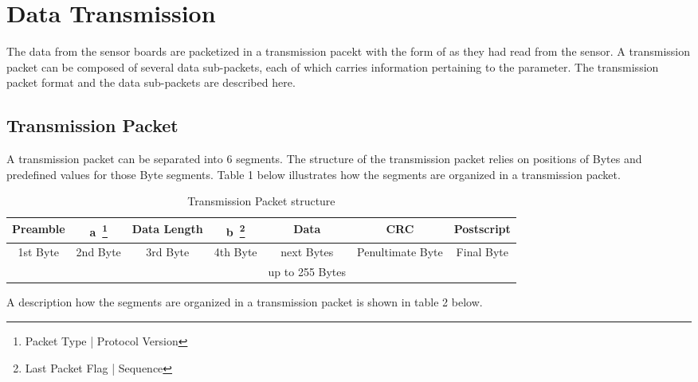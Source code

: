 \newpage
\section{Data Transmission} \label{section:overall}

The data from the sensor boards are packetized in a transmission pacekt with the form of as they had read from the sensor. A transmission packet can be composed of several data sub-packets, each of which carries information pertaining to the parameter.
The transmission packet format and the data sub-packets are described here.

\subsection{Transmission Packet}
A transmission packet can be separated into 6 segments.
The structure of the transmission packet relies on positions of Bytes and predefined values for those Byte segments. 
Table 1 below illustrates how the segments are organized in a transmission packet.
\\

\begin{table}[h!]
\begin{minipage}{\textwidth}
    \centering
    \caption{Transmission Packet structure}
    \label{table:tran}
    \begin{tabular}{|c|c|c|c|c|c|c|}
        \hline
        \rowcolor{black!8}
        \textbf{Preamble} & \textbf{a~\footnote{Packet Type | Protocol Version}} & \textbf{Data Length} & \textbf{b~\footnote{Last Packet Flag | Sequence}} & \textbf{Data} & \textbf{CRC} & \textbf{Postscript}\\
        \hline
        \multirow{2}{*}{1st Byte} & \multirow{2}{*}{2nd Byte} & \multirow{2}{*}{3rd Byte} & \multirow{2}{*}{4th Byte} & next Bytes & \multirow{2}{*}{Penultimate Byte} & \multirow{2}{*}{Final Byte} \\ 
        & & & & up to 255 Bytes & & \\ \hline
    \end{tabular}
\end{minipage}
\end{table}

A description how the segments are organized in a transmission packet is shown in table 2 below.

